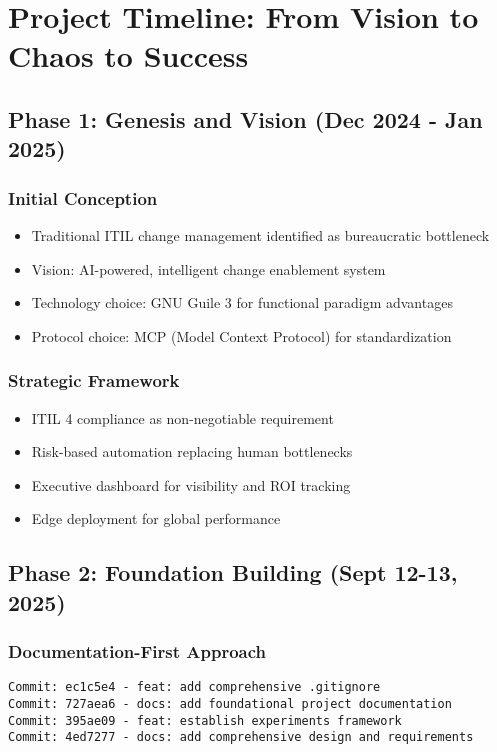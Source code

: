 \documentclass[11pt]{article}
\begin{document}
\section{Project Timeline: From Vision to Chaos to Success}
\label{sec:orgcf13db5}

\subsection{Phase 1: Genesis and Vision (Dec 2024 - Jan 2025)}
\label{sec:org6e6003d}
\subsubsection{Initial Conception}
\label{sec:org4dec9e1}
\begin{itemize}
\item Traditional ITIL change management identified as bureaucratic bottleneck
\item Vision: AI-powered, intelligent change enablement system
\item Technology choice: GNU Guile 3 for functional paradigm advantages
\item Protocol choice: MCP (Model Context Protocol) for standardization
\end{itemize}
\subsubsection{Strategic Framework}
\label{sec:org7f81ad0}
\begin{itemize}
\item ITIL 4 compliance as non-negotiable requirement
\item Risk-based automation replacing human bottlenecks
\item Executive dashboard for visibility and ROI tracking
\item Edge deployment for global performance
\end{itemize}
\subsection{Phase 2: Foundation Building (Sept 12-13, 2025)}
\label{sec:org2002ddb}
\subsubsection{Documentation-First Approach}
\label{sec:orga3d846b}
\begin{verbatim}
Commit: ec1c5e4 - feat: add comprehensive .gitignore
Commit: 727aea6 - docs: add foundational project documentation
Commit: 395ae09 - feat: establish experiments framework
Commit: 4ed7277 - docs: add comprehensive design and requirements
\end{verbatim}
\end{document}
